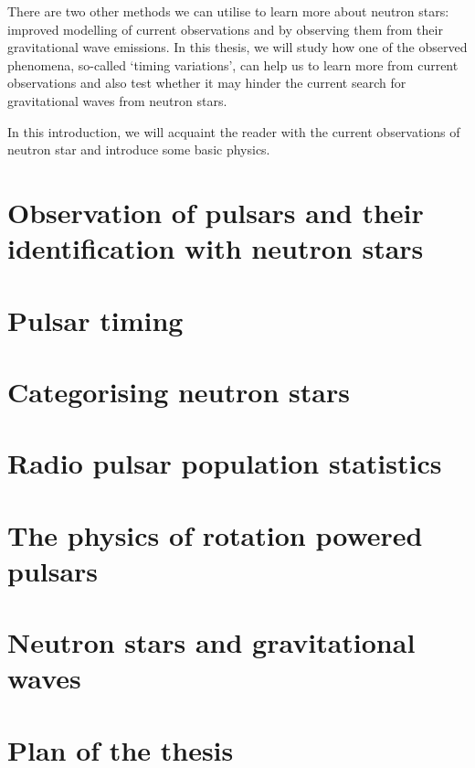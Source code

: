 \documentclass[../full_thesis/full_thesis.tex]{subfiles}
\newcommand{\thisdir}{../introduction}
\begin{document}
There are two other methods we can utilise to learn more about neutron stars: improved
modelling of current observations and by observing them from their
gravitational wave emissions. In this thesis, we will study how one of the
observed phenomena, so-called `timing variations', can help us to learn more
from current observations and also test whether it may hinder the current
search for gravitational waves from neutron stars.

In this introduction, we will acquaint the reader with the current observations
of neutron star and introduce some basic physics.

\section{Observation of pulsars and their identification with neutron stars}


\section{Pulsar timing}
\label{sec: pulsar timing methods}


\section{Categorising neutron stars}
\label{sec: categorising neutron stars}


\section{Radio pulsar population statistics}
\label{sec: population stats}


\section{The physics of rotation powered pulsars} 
\label{sec: rotation powered pulsars}


\section{Neutron stars and gravitational waves}
\label{sec: gravitational waves}



\section{Plan of the thesis}
\end{document}
